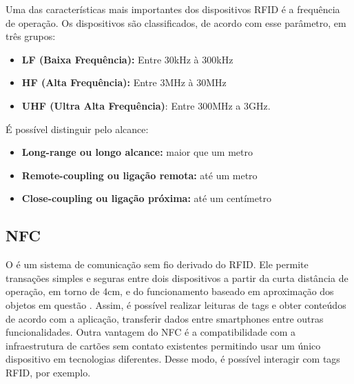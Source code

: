 

Uma das características mais importantes dos dispositivos RFID é a frequência de operação.
Os dispositivos são classificados, de acordo com esse parâmetro, em três grupos:

\begin{itemize} \parskip -1pt
	\item \textbf{LF (Baixa Frequência):} Entre 30kHz à 300kHz
	\item \textbf{HF (Alta Frequência):} Entre 3MHz à 30MHz
	\item \textbf{UHF (Ultra Alta Frequência)}: Entre 300MHz a 3GHz.
\end{itemize}

É possível distinguir pelo alcance:

\begin{itemize} \parskip -1pt
	\item \textbf{{Long-range} ou longo alcance:} maior que um metro
	\item \textbf{{Remote-coupling} ou ligação remota:} até um metro
	\item \textbf{{Close-coupling} ou ligação próxima:} até um centímetro
\end{itemize}


\subsection{NFC}
O  é um sistema de comunicação sem fio derivado do RFID. Ele permite transações simples e seguras entre dois dispositivos a partir da curta distância de operação, em torno de 4cm, e do funcionamento baseado em aproximação dos objetos em questão \cite{NFCForum2016}. 
Assim, é possível realizar leituras de tags e obter conteúdos de acordo com a aplicação, transferir dados entre smartphones entre outras funcionalidades.
Outra vantagem do NFC é a compatibilidade com a infraestrutura de cartões sem contato existentes permitindo usar um único dispositivo em tecnologias diferentes. Desse modo, é possível interagir com tags RFID, por exemplo.


